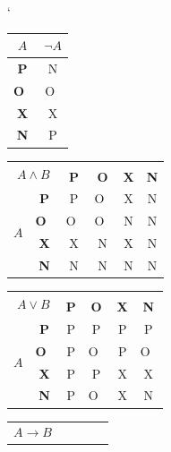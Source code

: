 \documentclass[a4paper, 11pt, ]{article}
\begin{document}
\begin{table}[h] 
    \begin{center}
    \catcode`
        \begin{tabular}[p]{|>{\bfseries}c|c|}
        	\hline
        	$A$	& ${\neg}A$	\\ \hline
        	P & N \\ \hline
        	O~& O~\\ \hline
        	X & X \\ \hline
        	N & P \\ \hline
    	\end{tabular}
        \begin{tabular}{|c|>{\bfseries}c|c|c|c|c|}
            \hline 
            \multicolumn{2}{|c|}{\multirow{2}{*}{$A \wedge B$}}&\multicolumn{4}{|c|}{$B$}\\\cline{3-6}
            \multicolumn{2}{|c|}{} & \textbf{P} & \textbf{O} & \textbf{X} & \textbf{N} \\ 
            \hline 
            \multirow{4}{*}{$A$}
            & P & P & O~& X & N \\ \cline{2-6} 
            & O~& O~& O~& N & N \\ \cline{2-6}
            & X & X & N & X & N \\ \cline{2-6}
            & N & N & N & N & N \\ \cline{2-6}
            \hline 
        \end{tabular}
        \begin{tabular}{|c|>{\bfseries}c|c|c|c|c|}
            \hline 
            \multicolumn{2}{|c|}{\multirow{2}{*}{$A \vee B$}}&\multicolumn{4}{|c|}{$B$}\\\cline{3-6}
            \multicolumn{2}{|c|}{} & \textbf{P} & \textbf{O} & \textbf{X} & \textbf{N} \\ 
            \hline 
            \multirow{4}{*}{$A$}
            & P & P & P & P & P \\ \cline{2-6} 
            & O~& P & O~& P & O~\\ \cline{2-6}
            & X & P & P & X & X \\ \cline{2-6}
            & N & P & O~& X & N \\ \cline{2-6}
            \hline 
        \end{tabular}
        \begin{tabular}{|c|>{\bfseries}c|c|c|c|c|}
            \hline 
            \multicolumn{2}{|c|}{\multirow{2}{*}{$A \rightarrow B$}}&\multicolumn{4}{|c|}{$B$}\\\cline{3-6}

\end{tabular}
\end{center}
\end{table}
\end{document}
